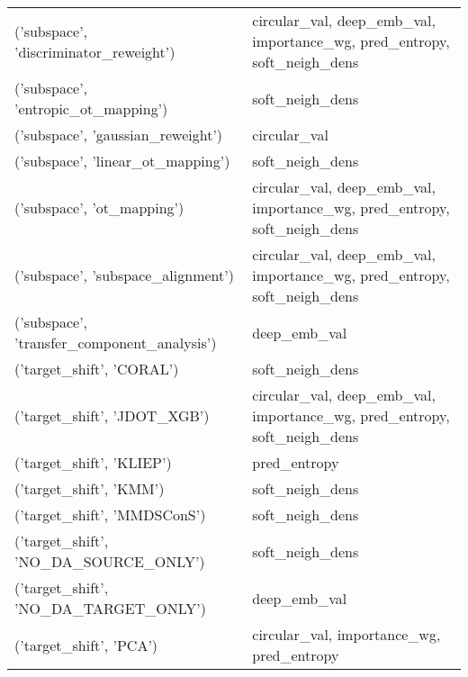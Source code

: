 \begin{tabular}{ll}
 ('subspace', 'discriminator\_reweight')              & circular\_val, deep\_emb\_val, importance\_wg, pred\_entropy, soft\_neigh\_dens \\
 ('subspace', 'entropic\_ot\_mapping')                 & soft\_neigh\_dens                                                          \\
 ('subspace', 'gaussian\_reweight')                   & circular\_val                                                             \\
 ('subspace', 'linear\_ot\_mapping')                   & soft\_neigh\_dens                                                          \\
 ('subspace', 'ot\_mapping')                          & circular\_val, deep\_emb\_val, importance\_wg, pred\_entropy, soft\_neigh\_dens \\
 ('subspace', 'subspace\_alignment')                  & circular\_val, deep\_emb\_val, importance\_wg, pred\_entropy, soft\_neigh\_dens \\
 ('subspace', 'transfer\_component\_analysis')         & deep\_emb\_val                                                             \\
 ('target\_shift', 'CORAL')                           & soft\_neigh\_dens                                                          \\
 ('target\_shift', 'JDOT\_XGB')                        & circular\_val, deep\_emb\_val, importance\_wg, pred\_entropy, soft\_neigh\_dens \\
 ('target\_shift', 'KLIEP')                           & pred\_entropy                                                             \\
 ('target\_shift', 'KMM')                             & soft\_neigh\_dens                                                          \\
 ('target\_shift', 'MMDSConS')                        & soft\_neigh\_dens                                                          \\
 ('target\_shift', 'NO\_DA\_SOURCE\_ONLY')               & soft\_neigh\_dens                                                          \\
 ('target\_shift', 'NO\_DA\_TARGET\_ONLY')               & deep\_emb\_val                                                             \\
 ('target\_shift', 'PCA')                             & circular\_val, importance\_wg, pred\_entropy                                \\

\end{tabular}
